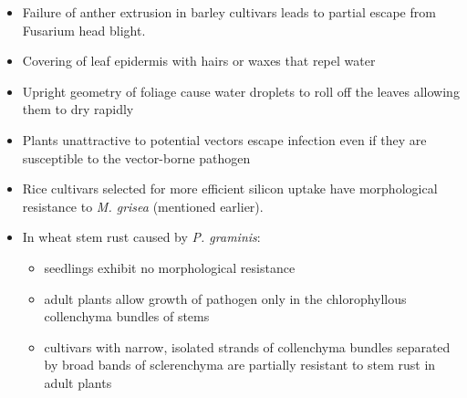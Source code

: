 \documentclass[11pt,dvipsnames,ignorenonframetext,aspectratio=169]{beamer}
\providecommand{\tightlist}{%
  \setlength{\itemsep}{0pt}\setlength{\parskip}{0pt}}
\begin{document}
\begin{frame}{}
\protect\hypertarget{section-1}{}
\begin{itemize}
\tightlist
\item
  Failure of anther extrusion in barley cultivars leads to partial
  escape from Fusarium head blight.
\item
  Covering of leaf epidermis with hairs or waxes that repel water
\item
  Upright geometry of foliage cause water droplets to roll off the
  leaves allowing them to dry rapidly
\item
  Plants unattractive to potential vectors escape infection even if they
  are susceptible to the vector-borne pathogen
\item
  Rice cultivars selected for more efficient silicon uptake have
  morphological resistance to \textit{M. grisea} (mentioned earlier).
\item
  In wheat stem rust caused by \textit{P. graminis}:

  \begin{itemize}
  \tightlist
  \item
    seedlings exhibit no morphological resistance
  \item
    adult plants allow growth of pathogen only in the chlorophyllous
    collenchyma bundles of stems
  \item
    cultivars with narrow, isolated strands of collenchyma bundles
    separated by broad bands of sclerenchyma are partially resistant to
    stem rust in adult plants
  \end{itemize}
\end{itemize}
\end{frame}
\end{document}
